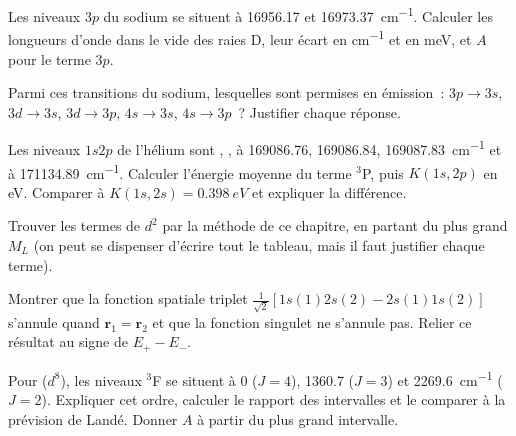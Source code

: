 \begin{exercise}[$\star\star$]\label{exo:b3:many-electron-atoms:6}
Les niveaux $3p$ du sodium se situent à 16956.17 et
\qty{16973.37}{cm^{-1}}. Calculer les longueurs d'onde dans le vide des
raies D, leur écart en \unit{cm^{-1}} et en meV, et $A$ pour le terme $3p$.
\end{exercise}

\begin{exercise}[$\star\star$]\label{exo:b3:many-electron-atoms:7}
Parmi ces transitions du sodium, lesquelles sont permises en émission~:
$3p \to 3s$,
$3d \to 3s$, $3d \to 3p$, $4s \to 3s$, $4s \to 3p$~? Justifier chaque
réponse.
\end{exercise}

\begin{exercise}[$\star\star$]\label{exo:b3:many-electron-atoms:8}
Les niveaux $1s2p$ de l'hélium sont , ,
 à 169086.76, 169086.84, \qty{169087.83}{cm^{-1}} et
 à \qty{171134.89}{cm^{-1}}. Calculer l'énergie moyenne du
terme ${}^3$P, puis $K(1s,2p)$ en eV. Comparer à $K(1s,2s) = \qty{0.398}{eV}$
et expliquer la différence.
\end{exercise}

\begin{exercise}[$\star\star$]\label{exo:b3:many-electron-atoms:9}
Trouver les termes de $d^2$ par la méthode de ce chapitre, en partant du
plus grand $M_L$ (on peut se dispenser d'écrire tout le tableau, mais il
faut justifier chaque terme).
\end{exercise}

\begin{exercise}[$\star\star\star$]\label{exo:b3:many-electron-atoms:10}
Montrer que la fonction spatiale triplet $\frac{1}{\sqrt2}[1s(1)2s(2) -
2s(1)1s(2)]$ s'annule quand $\mathbf r_1 = \mathbf r_2$ et que la fonction
singulet ne s'annule pas. Relier ce résultat au signe de $E_+ - E_-$.
\end{exercise}

\begin{exercise}[$\star\star\star$]\label{exo:b3:many-electron-atoms:11}
Pour  ($d^8$), les niveaux ${}^3$F se situent à 0 ($J = 4$),
1360.7 ($J = 3$)
et \qty{2269.6}{cm^{-1}} ($J = 2$). Expliquer cet ordre, calculer le
rapport des intervalles et le comparer à la prévision de Landé. Donner
$A$ à partir du plus grand intervalle.
\end{exercise}

